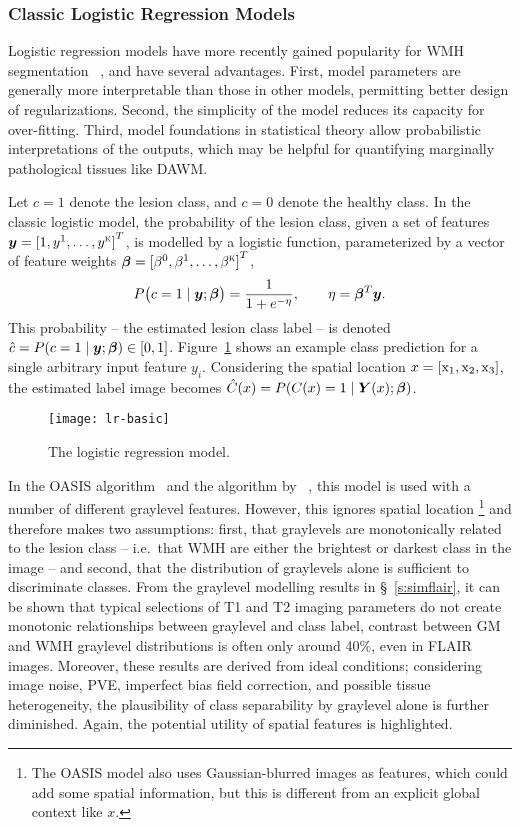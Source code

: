 \subsubsection{Classic Logistic Regression Models}\label{sss:limits-lr}
Logistic regression models have more recently gained popularity for WMH segmentation%
~\cite{Sweeney2013,Zhan2017,Sweeney2013a,Schmidt2017a}, and have several advantages.
First, model parameters are generally more interpretable than those in other models,
permitting better design of regularizations.
Second, the simplicity of the model reduces its capacity for over-fitting.
Third, model foundations in statistical theory allow probabilistic interpretations of the outputs,
which may be helpful for quantifying marginally pathological tissues like DAWM.
\par
Let $c=1$ denote the lesion class, and $c=0$ denote the healthy class.
In the classic logistic model,
the probability of the lesion class,
given a set of features $\bm{y} = {[1,y^1,\dots,y^{\textsc{k}}]}^T$,
is modelled by a logistic function,
parameterized by a vector of feature weights $\bm{\beta} = {[\beta^0,\beta^1,\dots,\beta^{\textsc{k}}]}^T$,
\begin{equation}
  P\big(c=1\mid\by;\bb\big) = \frac{1}{1+e^{-\eta}},\qquad\eta = \bb^T\by.%
  \label{eq:lrmodel-basic}
\end{equation}
This probability -- the estimated lesion class label --
is denoted $\hat{c} = P(c=1\mid\bm{y};\bm{\beta}) \in [0,1]$.
Figure~\ref{fig:lr-basic} shows an example class prediction
for a single arbitrary input feature $y_i$.
Considering the spatial location $x = [\mathrm{x}_1,\mathrm{x}_2,\mathrm{x}_3]$,
the estimated label image becomes $\hat{C}(x) = P(C(x)=1\mid\bm{Y}(x);\bm{\beta})$.
\par
\begin{figure}
  \centering\texttt{[image: lr-basic]}
  \caption{The logistic regression model.}%
  \label{fig:lr-basic}
\end{figure}
In the OASIS algorithm~\cite{Sweeney2013,Sweeney2013a}
and the algorithm by \citeauthor{Zhan2017}~\cite{Zhan2017},
this model is used with a number of different graylevel features.
However, this ignores spatial location%
\footnote{The OASIS model also uses Gaussian-blurred images as features,
  which could add some spatial information,
  but this is different from an explicit global context like $x$.}
and therefore makes two assumptions:
first, that graylevels are monotonically related to the lesion class
-- i.e.\ that WMH are either the brightest or darkest class in the image --
and second, that the distribution of graylevels alone is sufficient to discriminate classes.
From the graylevel modelling results in \S~\ref{s:simflair},
it can be shown that typical selections of T1 and T2 imaging parameters
do not create monotonic relationships between graylevel and class label,
contrast between GM and WMH graylevel distributions
is often only around 40\%, even in FLAIR images.
Moreover, these results are derived from ideal conditions;
considering image noise, PVE, imperfect bias field correction, and possible tissue heterogeneity,
the plausibility of class separability by graylevel alone is further diminished.
Again, the potential utility of spatial features is highlighted.
